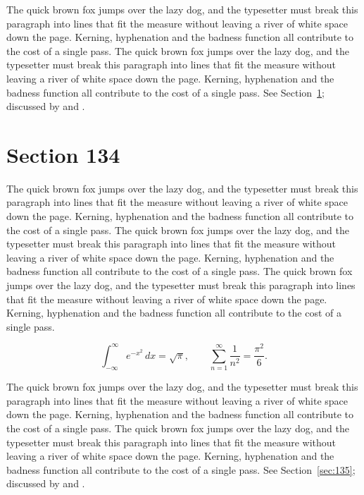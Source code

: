 \documentclass{article}
\begin{document}
The quick brown fox jumps over the lazy dog, and the typesetter must break this paragraph into lines that fit the measure without leaving a river of white space down the page. Kerning, hyphenation and the badness function all contribute to the cost of a single pass. The quick brown fox jumps over the lazy dog, and the typesetter must break this paragraph into lines that fit the measure without leaving a river of white space down the page. Kerning, hyphenation and the badness function all contribute to the cost of a single pass. 
See Section~\ref{sec:134}; discussed by \textcite{k4} and \textcite{l1}.
\section{Section 134}
\label{sec:134}
The quick brown fox jumps over the lazy dog, and the typesetter must break this paragraph into lines that fit the measure without leaving a river of white space down the page. Kerning, hyphenation and the badness function all contribute to the cost of a single pass. The quick brown fox jumps over the lazy dog, and the typesetter must break this paragraph into lines that fit the measure without leaving a river of white space down the page. Kerning, hyphenation and the badness function all contribute to the cost of a single pass. The quick brown fox jumps over the lazy dog, and the typesetter must break this paragraph into lines that fit the measure without leaving a river of white space down the page. Kerning, hyphenation and the badness function all contribute to the cost of a single pass. 

\begin{equation}\label{eq:134}
\int_{-\infty}^{\infty} e^{-x^{2}}\,dx = \sqrt{\pi}, \qquad
\sum_{n=1}^{\infty} \frac{1}{n^{2}} = \frac{\pi^{2}}{6}.
\end{equation}

The quick brown fox jumps over the lazy dog, and the typesetter must break this paragraph into lines that fit the measure without leaving a river of white space down the page. Kerning, hyphenation and the badness function all contribute to the cost of a single pass. The quick brown fox jumps over the lazy dog, and the typesetter must break this paragraph into lines that fit the measure without leaving a river of white space down the page. Kerning, hyphenation and the badness function all contribute to the cost of a single pass. 
See Section~\ref{sec:135}; discussed by \textcite{k5} and \textcite{l2}.
\end{document}
